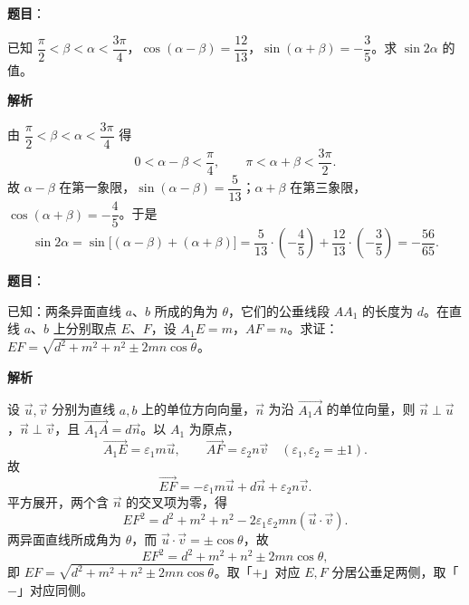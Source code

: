 \begin{answer}

\textbf{题目}：

已知 \(\dfrac{\pi}{2}<\beta<\alpha<\dfrac{3\pi}{4}\)，\(\cos(\alpha-\beta)=\dfrac{12}{13}\)，\(\sin(\alpha+\beta)=-\dfrac{3}{5}\)。求 \(\sin 2\alpha\) 的值。

\textbf{解析}

由 \(\dfrac{\pi}{2}<\beta<\alpha<\dfrac{3\pi}{4}\) 得
\nopagebreak[4]
\[
0<\alpha-\beta<\frac{\pi}{4},\qquad \pi<\alpha+\beta<\frac{3\pi}{2}.
\]
故 \(\alpha-\beta\) 在第一象限，\(\sin(\alpha-\beta)=\dfrac{5}{13}\)；\(\alpha+\beta\) 在第三象限，\(\cos(\alpha+\beta)=-\dfrac45\)。于是
\nopagebreak[4]
\[
\sin2\alpha
=\sin\big[(\alpha-\beta)+(\alpha+\beta)\big]
=\frac{5}{13}\cdot\left(-\frac45\right)+\frac{12}{13}\cdot\left(-\frac35\right)
=-\frac{56}{65}.
\]


\end{answer}
\begin{answer}

\textbf{题目}：

已知：两条异面直线 \(a\)、\(b\) 所成的角为 \(\theta\)，它们的公垂线段 \(AA_1\) 的长度为 \(d\)。在直线 \(a\)、\(b\) 上分别取点 \(E\)、\(F\)，设 \(A_1E=m\)，\(AF=n\)。求证：\(EF=\sqrt{d^{2}+m^{2}+n^{2}\pm 2mn\cos\theta}\)。

\textbf{解析}

设 \(\vec u,\vec v\) 分别为直线 \(a,b\) 上的单位方向向量，\(\vec n\) 为沿 \(\overrightarrow{A_1A}\) 的单位向量，则 \(\vec n\perp\vec u\)，\(\vec n\perp\vec v\)，且 \(\overrightarrow{A_1A}=d\vec n\)。以 \(A_1\) 为原点，
\nopagebreak[4]
\[
\overrightarrow{A_1E}=\varepsilon_1 m\vec u,\qquad
\overrightarrow{AF}=\varepsilon_2 n\vec v
\quad(\varepsilon_1,\varepsilon_2=\pm1).
\]
故
\nopagebreak[4]
\[
\overrightarrow{EF}=-\varepsilon_1 m\vec u+d\vec n+\varepsilon_2 n\vec v.
\]
平方展开，两个含 \(\vec n\) 的交叉项为零，得
\nopagebreak[4]
\[
EF^2=d^2+m^2+n^2-2\varepsilon_1\varepsilon_2 mn(\vec u\cdot\vec v).
\]
两异面直线所成角为 \(\theta\)，而 \(\vec u\cdot\vec v=\pm\cos\theta\)，故
\nopagebreak[4]
\[
EF^2=d^2+m^2+n^2\pm2mn\cos\theta,
\]
即 \(EF=\sqrt{d^2+m^2+n^2\pm2mn\cos\theta}\)。取「\(+\)」对应 \(E,F\) 分居公垂足两侧，取「\(-\)」对应同侧。


\end{answer}
